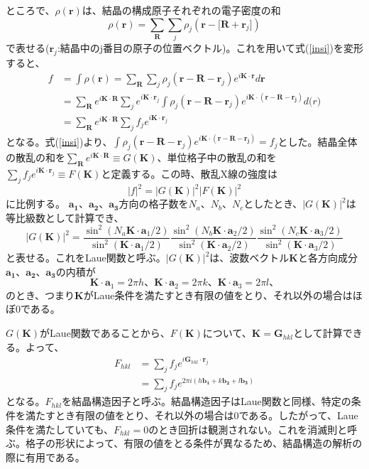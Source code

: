 \documentclass[11pt,a4j,uplatex]{jsarticle}
\begin{document}
\newpage
ところで、$\rho(\bm{r})$は、結晶の構成原子それぞれの電子密度の和
\begin{equation}
  \rho(\bm{r})=\sum_{\bm{R}}\sum_j\rho_j(\bm{r-[R+}\bm{r}_j])
\end{equation}
で表せる($\bm{r}_j$:結晶中のj番目の原子の位置ベクトル)。これを用いて式(\ref{insi})を変形すると、
\begin{equation}
  \begin{split}
  f&=\int\rho(\bm{r})=\sum_{\bm{R}}\sum_j\rho_j(\bm{r-R-}\bm{r}_j)e^{i\bm{K\cdot r}}d\bm{r}\\
  &=\sum_{\bm{R}}e^{i\bm{K\cdot R}}\sum_je^{i\bm{K}\cdot\bm{r}_j}\int\rho_j(\bm{r-R-}\bm{r}_j)e^{i\bm{K\cdot (\bm{r-R-}\bm{r}_j)}}d\bm(r)\\
  &=\sum_{\bm{R}}e^{i\bm{K\cdot R}}\sum_jf_je^{i\bm{K}\cdot\bm{r}_j}
\end{split}
\end{equation}
となる。式(\ref{insi})より、$\int\rho_j(\bm{r-R-}\bm{r}_j)e^{i\bm{K\cdot (\bm{r-R-}\bm{r}_j)}}=f_j$とした。結晶全体の散乱の和を$\sum_{\bm{R}}e^{i\bm{K\cdot R}}\equiv G(\bm{K})$、単位格子中の散乱の和を$\sum_jf_je^{i\bm{K}\cdot\bm{r}_j}\equiv F(\bm{K})$と定義する。この時、散乱X線の強度は
\begin{equation}
  {|f|}^2={|G\bm{(K)}|^2}{|F\bm{(K)}|^2}
  \label{kyoudo}
\end{equation}に比例する。
$\bm{a_1}、\bm{a_2}、\bm{a_3}$方向の格子数を$N_a、N_b、N_c$としたとき、$|G(\bm{K})|^2$は等比級数として計算でき、
\begin{equation}
  |G(\bm{K})|^2=\frac{\sin^2(N_a\bm{K}\cdot\bm{a}_1/2)}{\sin^2(\bm{K}\cdot\bm{a}_1/2)}\frac{\sin^2(N_b\bm{K}\cdot\bm{a}_2/2)}{\sin^2(\bm{K}\cdot\bm{a}_2/2)}\frac{\sin^2(N_c\bm{K}\cdot\bm{a}_3/2)}{\sin^2(\bm{K}\cdot\bm{a}_3/2)}
\end{equation}
と表せる。これをLaue関数と呼ぶ。$|G(\bm{K})|^2$は、波数ベクトル$\bm{K}$と各方向成分$\bm{a_1}、\bm{a_2}、\bm{a_3}$の内積が
\begin{equation}
  \bm{K}\cdot\bm{a}_1=2\pi h、\bm{K}\cdot\bm{a}_2=2\pi k、\bm{K}\cdot\bm{a}_3=2\pi l、
\end{equation}
のとき、つまり$\bm{K}$がLaue条件を満たすとき有限の値をとり、それ以外の場合はほぼ0である。%

$G(\bm{K})$がLaue関数であることから、$F(\bm{K})$について、$\bm{K}=\bm{G}_{hkl}$として計算できる。よって、
\begin{equation}
\begin{split}
    F_{hkl}&=\sum_jf_je^{i\bm{G}_{hkl}\cdot\bm{r}_j}\\
    &=\sum_jf_je^{2\pi i(h\bm{b_1}+k\bm{b_2}+l\bm{b_3})}
\end{split}
\end{equation}
となる。$F_{hkl}$を結晶構造因子と呼ぶ。結晶構造因子はLaue関数と同様、特定の条件を満たすとき有限の値をとり、それ以外の場合は0である。したがって、Laue条件を満たしていても、$F_{hkl}=0$のとき回折は観測されない。これを消滅則と呼ぶ。格子の形状によって、有限の値をとる条件が異なるため、結晶構造の解析の際に有用である。
\end{document}
